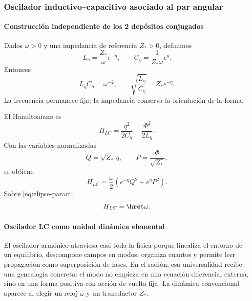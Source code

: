 \subsubsection{Oscilador inductivo--capacitivo asociado al par angular}

\paragraph{Construcción independiente de los 2 depósitos conjugados}

Dados \(\omega>0\) y una impedancia de referencia \(Z_*>0\), definimos
\begin{equation}
L_\eta=\frac{Z_*}{\omega}e^{-\eta},
\qquad
C_\eta=\frac{1}{Z_*\omega}e^\eta.
\label{eq:LC-def}
\end{equation}
Entonces
\begin{equation}
L_\eta C_\eta=\omega^{-2},
\qquad
\sqrt{\frac{L_\eta}{C_\eta}}=Z_*e^{-\eta}.
\label{eq:LC-invariants}
\end{equation}
La frecuencia permanece fija; la impedancia conserva la orientación de la
forma.

El Hamiltoniano es
\begin{equation}
H_{LC}=\frac{q^2}{2C_\eta}+\frac{\Phi^2}{2L_\eta}.
\label{eq:HLC}
\end{equation}
Con las variables normalizadas
\begin{equation}
Q=\sqrt{Z_*}\,q,\qquad
P=\frac{\Phi}{\sqrt{Z_*}},
\label{eq:LC-map}
\end{equation}
se obtiene
\begin{equation}
H_{LC}=\frac\omega2
\left(e^{-\eta}Q^2+e^\eta P^2\right).
\label{eq:HLC-QP}
\end{equation}
Sobre \eqref{eq:elipse-param},
\begin{equation}
H_{LC}=\hret\omega.
\label{eq:LC-level}
\end{equation}

\paragraph{Oscilador LC como unidad dinámica elemental}

El oscilador armónico atraviesa casi toda la física porque linealiza el
entorno de un equilibrio, descompone campos en modos, organiza cuantos y
permite leer propagación como superposición de fases. En el radión, esa
universalidad recibe una genealogía concreta: el modo no empieza en una
ecuación diferencial externa, sino en una forma positiva con acción de vuelta
fija. La dinámica convencional aparece al elegir un reloj \(\omega\) y un
transductor \(Z_*\).

